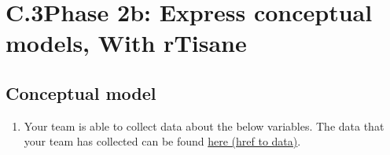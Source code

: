 \documentclass[
]{article}
\author{}
\date{\vspace{-2.5em}}
\providecommand{\tightlist}{%
  \setlength{\itemsep}{0pt}\setlength{\parskip}{0pt}}
\begin{document}
\setcounter{page}{172}

\hypertarget{conceptual-model}{%
\section{C.3\hspace{0.5cm}Phase 2b: Express conceptual models, With rTisane}
\subsection{Conceptual model}\label{conceptual-model}}

\begin{enumerate}
\def\labelenumi{\arabic{enumi}.}
\tightlist
\item
  Your team is able to collect data about the below variables. The data
  that your team has collected can be found
  \href{https://homes.cs.washington.edu/~emjun/income_final.csv}{here (href to data)}.
\end{enumerate}
\end{document}
